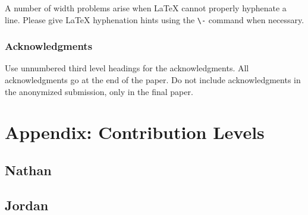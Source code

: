 \documentclass{article}
\begin{document}
A number of width problems arise when \LaTeX{} cannot properly
hyphenate a line. Please give LaTeX hyphenation hints using the
\verb+\-+ command when necessary.

\subsubsection*{Acknowledgments}

Use unnumbered third level headings for the acknowledgments. All
acknowledgments go at the end of the paper. Do not include
acknowledgments in the anonymized submission, only in the final paper.

\section*{Appendix: Contribution Levels}

\subsection*{Nathan}

\subsection*{Jordan}
\end{document}
